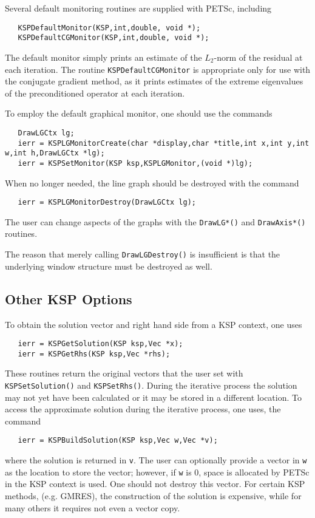Several default monitoring routines are supplied with PETSc, 
including  
\begin{verbatim}
   KSPDefaultMonitor(KSP,int,double, void *);
   KSPDefaultCGMonitor(KSP,int,double, void *);
\end{verbatim}
The default monitor simply prints an estimate of the $L_2$-norm of the 
residual at each iteration. The routine
{\tt KSPDefaultCGMonitor} is appropriate only for use with the conjugate 
gradient method, as it prints estimates of the extreme eigenvalues of the 
preconditioned operator at each iteration.

To employ the default graphical monitor, one should use the 
commands  
\begin{verbatim}
   DrawLGCtx lg;
   ierr = KSPLGMonitorCreate(char *display,char *title,int x,int y,int w,int h,DrawLGCtx *lg);
   ierr = KSPSetMonitor(KSP ksp,KSPLGMonitor,(void *)lg);
\end{verbatim}
When no longer needed, the line graph should be destroyed 
with the command
\begin{verbatim}
   ierr = KSPLGMonitorDestroy(DrawLGCtx lg);
\end{verbatim}
The user can change aspects of the graphs with the {\tt DrawLG*()} and 
{\tt DrawAxis*()} routines.  

\begin{design}
The reason that merely calling {\tt DrawLGDestroy()} is insufficient is
that the underlying window structure must be destroyed as well.
\end{design}

\subsection{Other KSP Options}

To obtain the solution vector and right hand side from a KSP 
context, one uses  
\begin{verbatim}
   ierr = KSPGetSolution(KSP ksp,Vec *x);
   ierr = KSPGetRhs(KSP ksp,Vec *rhs);
\end{verbatim}
These routines return the original vectors that the user set with 
{\tt KSPSetSolution()} and {\tt KSPSetRhs()}. 
During  the iterative process
the solution may not yet have been calculated or it may be stored in 
a different location. To access the approximate solution during the 
iterative process, one uses, the command 
\begin{verbatim}
   ierr = KSPBuildSolution(KSP ksp,Vec w,Vec *v);
\end{verbatim}
where the solution is returned in {\tt v}. The user can optionally provide
a vector in {\tt w} as the location to store the vector; however, if 
{\tt w} is 0, space is allocated by PETSc in the KSP context is 
used. One should not destroy this vector. For certain KSP methods, 
(e.g. GMRES), the construction of the solution is expensive, while for many 
others it requires not even a vector copy. 

